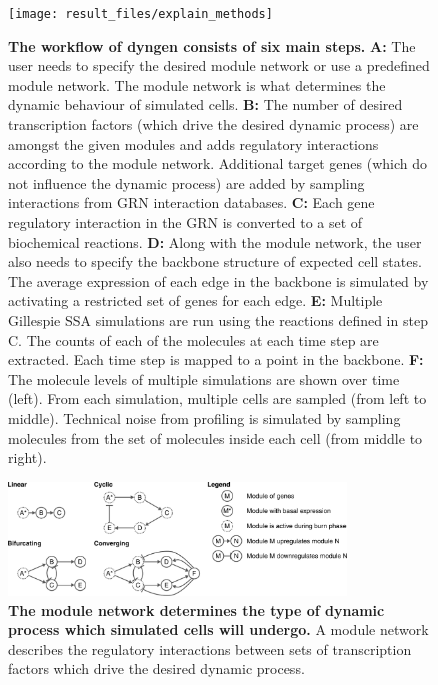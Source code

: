 \documentclass[
  table,
  10pt,
  a4paper]{article}
\begin{document}
\begin{figure}[H]
    \centering
    \texttt{[image: result\_files/explain\_methods]}
    \caption{\textbf{The workflow of dyngen consists of six main steps.} 
    \textbf{A:} The user needs to specify the desired module network or use a predefined module network. The module network is what determines the dynamic behaviour of simulated cells.
    \textbf{B:} The number of desired transcription factors (which drive the desired dynamic process) are amongst the given modules and adds regulatory interactions according to the module network. Additional target genes (which do not influence the dynamic process) are added by sampling interactions from GRN interaction databases.
    \textbf{C:} Each gene regulatory interaction in the GRN is converted to a set of biochemical reactions. 
    \textbf{D:} Along with the module network, the user also needs to specify the backbone structure of expected cell states. The average expression of each edge in the backbone is simulated by activating a restricted set of genes for each edge. 
    \textbf{E:} Multiple Gillespie SSA simulations are run using the reactions defined in step C.  The counts of each of the molecules at each time step are extracted. Each time step is mapped to a point in the backbone. 
    \textbf{F:} The molecule levels of multiple simulations are shown over time (left). From each simulation, multiple cells are sampled (from left to middle). Technical noise from profiling is simulated by sampling molecules from the set of molecules inside each cell (from middle to right).
    }
    \label{fig:explain_methods}
\end{figure}

\begin{figure}[H]
    \centering
    \includegraphics[width=0.8\textwidth]{result_files/example_backbones_onlymodules}
    \caption{
      \textbf{The module network determines the type of dynamic process which simulated cells will undergo.} A module network describes the regulatory interactions between sets of transcription factors which drive the desired dynamic process.
    }
    \label{fig:example_backbones_onlymodules}
\end{figure}
\end{document}
